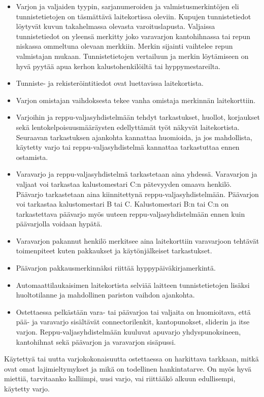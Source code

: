 \begin{itemize}
\item  Varjon ja valjaiden tyypin, sarjanumeroiden ja valmistusmerkintöjen eli tunnistetietojen on täsmättävä laitekortissa oleviin. Kupujen tunnistetiedot löytyvät kuvun takahelmassa olevasta varoituslapusta. Valjaissa tunnistetiedot on yleensä merkitty joko varavarjon kantohihnassa tai repun niskassa ommeltuna olevaan merkkiin. Merkin sijainti vaihtelee repun valmistajan mukaan. Tunnistetietojen vertailuun ja merkin löytämiseen on hyvä pyytää apua kerhon kalustohenkilöiltä tai hyppymestareilta. 
\item  Tunniste- ja rekisteröintitiedot ovat luettavissa laitekortista. 
\item  Varjon omistajan vaihdoksesta tekee vanha omistaja merkinnän laitekorttiin.   
\item  Varjoihin ja reppu-valjasyhdistelmään tehdyt tarkastukset, huollot, korjaukset sekä lentokelpoisuusmääräysten edellyttämät työt näkyvät laitekortista. Seuraavan tarkastuksen ajankohta kannattaa huomioida, ja jos mahdollista, käytetty varjo tai reppu-valjasyhdistelmä kannattaa tarkastuttaa ennen ostamista. 
\item  Varavarjo ja reppu-valjasyhdistelmä tarkastetaan aina yhdessä. Varavarjon ja valjaat voi tarkastaa kalustomestari C:n pätevyyden omaava henkilö. Päävarjo tarkastetaan aina kiinnitettynä reppu-valjasyhdistelmään. Päävarjon voi tarkastaa kalustomestari B tai C. Kalustomestari B:n tai C:n on tarkastettava päävarjo myös uuteen reppu-valjasyhdistelmään ennen kuin päävarjolla voidaan hypätä. 
\item  Varavarjon pakannut henkilö merkitsee aina laitekorttiin varavarjoon tehtävät toimenpiteet kuten pakkaukset ja käytönjälkeiset tarkastukset. 
\item  Päävarjon pakkausmerkinnäksi riittää hyppypäiväkirjamerkintä.  
\item  Automaattilaukaisimen laitekortista selviää laitteen tunnistetietojen lisäksi huoltotilanne ja mahdollinen pariston vaihdon ajankohta. 
\item  Ostettaessa pelkästään vara- tai päävarjoa tai valjaita on huomioitava, että pää- ja varavarjo sisältävät connectorilenkit, kantopunokset, sliderin ja itse varjon. Reppu-valjasyhdistelmään kuuluvat apuvarjo yhdyspunoksineen, kantohihnat sekä päävarjon ja varavarjon sisäpussi. 
\end{itemize}

Käytettyä tai uutta varjokokonaisuutta ostettaessa on harkittava tarkkaan, mitkä ovat omat lajimieltymykset ja mikä on todellinen hankintatarve. On myös hyvä miettiä, tarvitaanko kalliimpi, uusi varjo, vai riittääkö alkuun edullisempi, käytetty varjo. 

